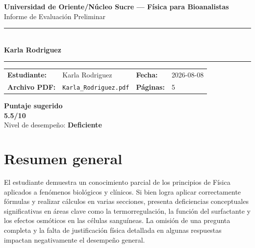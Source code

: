 \documentclass[11pt,a4paper]{article}
\begin{document}
\begin{center}
  {\Large\bfseries\color{azulTitulo} Universidad de Oriente/Núcleo Sucre --- Física para Bioanalistas}\\[4pt]
  {\large Informe de Evaluación Preliminar}\\[12pt]
  \rule{\linewidth}{1.2pt}\\[6pt]
  {\LARGE\bfseries Karla Rodriguez}\\[4pt]
  \rule{\linewidth}{0.6pt}
\end{center}

\vspace{4pt}
\begin{tcolorbox}[cajaTitulo, title=Datos del informe]
\begin{tabular}{@{}llll@{}}
  \textbf{Estudiante:}  & Karla Rodriguez  &
  \textbf{Fecha:}       & 2026-08-08 \\[4pt]
  \textbf{Archivo PDF:} & \texttt{Karla\_Rodriguez.pdf}  &
  \textbf{Páginas:}     & 5 \\
\end{tabular}
\end{tcolorbox}

\vspace{6pt}
\begin{center}
  \begin{tcolorbox}[
    enhanced,
    colback=white, colframe=desempeno_deficiente,
    width=0.62\linewidth,
    boxrule=2pt,
    halign=center, valign=center,
    top=8pt, bottom=8pt,
  ]
    \centering
    {\large\bfseries Puntaje sugerido}\\[6pt]
    {\Huge\bfseries\color{desempeno_deficiente} 5.5/10}\\[6pt]
    {\large Nivel de desempeño: \textbf{\color{desempeno_deficiente} Deficiente}}
  \end{tcolorbox}
\end{center}

\section*{Resumen general}
El estudiante demuestra un conocimiento parcial de los principios de Física aplicados a fenómenos biológicos y clínicos. Si bien logra aplicar correctamente fórmulas y realizar cálculos en varias secciones, presenta deficiencias conceptuales significativas en áreas clave como la termorregulación, la función del surfactante y los efectos osmóticos en las células sanguíneas. La omisión de una pregunta completa y la falta de justificación física detallada en algunas respuestas impactan negativamente el desempeño general.
\end{document}
